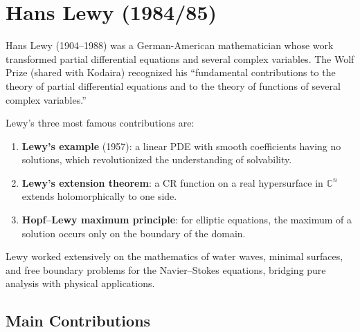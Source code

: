 \let\Supp\relax
\newcommand{\Supp}{\operatorname{Supp}}
\let\ind\relax
\newcommand{\ind}{\operatorname{ind}}
\let\sgn\relax
\newcommand{\sgn}{\operatorname{sgn}}
\let\N\relax
\newcommand{\N}{\mathbb{N}}
\let\R\relax
\newcommand{\R}{\mathbb{R}}
\let\C\relax
\newcommand{\C}{\mathbb{C}}
\let\Q\relax
\newcommand{\Q}{\mathbb{Q}}
\let\Z\relax
\newcommand{\Z}{\mathbb{Z}}

\chapter{Hans Lewy (1984/85)}

Hans Lewy (1904--1988) was a German-American mathematician whose work transformed partial differential equations and several complex variables. The Wolf Prize (shared with Kodaira) recognized his ``fundamental contributions to the theory of partial differential equations and to the theory of functions of several complex variables.''

Lewy's three most famous contributions are:
\begin{enumerate}
    \item \textbf{Lewy's example} (1957): a linear PDE with smooth coefficients having no solutions, which revolutionized the understanding of solvability.
    \item \textbf{Lewy's extension theorem}: a CR function on a real hypersurface in $\mathbb{C}^n$ extends holomorphically to one side.
    \item \textbf{Hopf--Lewy maximum principle}: for elliptic equations, the maximum of a solution occurs only on the boundary of the domain.
\end{enumerate}

Lewy worked extensively on the mathematics of water waves, minimal surfaces, and free boundary problems for the Navier--Stokes equations, bridging pure analysis with physical applications.

\section{Main Contributions}


